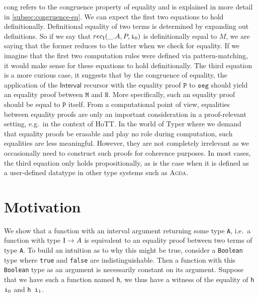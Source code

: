 \documentclass[12pt,twoside,maitrise]{dms}
\theoremstyle{definition}
\numberwithin{equation}{section}
\numberwithin{table}{chapter}
\numberwithin{figure}{chapter}
\newcommand\kw[1] {\textsf{#1}}
\newcommand\id[1] {\texttt{#1}}
\newcommand\fn[1] {\texttt{#1}}
\def\Agda{\textsc{Agda}\xspace}
\begin{document}
\kw{cong} refers to the congruence property of equality and is explained in more
detail in \autoref{subsec:congruence-eq}. We can expect the first two equations
to hold definitionally. Definitional equality of two terms is determined by
expanding out definitions. So if we say that $rec_{\bI}(\_ . A, P, \ileft)$ is
definitionally equal to $M$, we are saying that the former reduces to the latter
when we check for equality. If we imagine that the first two computation rules
were defined via pattern-matching, it would make sense for these equations to
hold definitionally. The third equation is a more curious case, it suggests that
by the congruence of equality, the application of the $\kw{Interval}$ recursor
with the equality proof $\id{P}$ to $\id{seg}$ should yield an equality proof
between $\id{M}$ and $\id{N}$. More specifically, such an equality proof should
be equal to $\id{P}$ itself. From a computational point of view, equalities
between equality proofs are only an important consideration in a proof-relevant
setting, e.g.\ in the context of HoTT. In the world of Typer where we demand
that equality proofs be erasable and play no role during computation, such
equalities are less meaningful. However, they are not completely irrelevant as
we occasionally need to construct such proofs for coherence purposes. In most
cases, the third equation only holds propositionally, as is the case when it is
defined as a user-defined datatype in other type systems such as \Agda{}.

\section{Motivation}
We show that a function with an interval argument returning some type \id{A},
i.e.\ a function with type \fn{$\mathrm{I} \rightarrow A$} is equivalent to an equality
proof between two terms of type \id{A}. To build an intuition as to why this
might be true, consider a \id{Boolean} type where \id{true} and \id{false} are
indistinguishable. Then a function with this \id{Boolean} type as an argument is
necessarily constant on its argument. Suppose that we have such a function named
\id{h}, we thus have a witness of the equality of \fn{h $\ileft$} and \fn{h
  $\iright$}.
\end{document}
